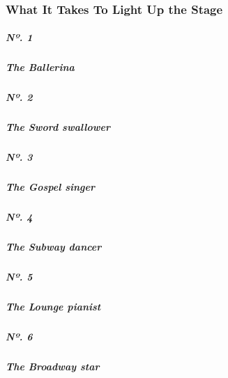 \hypertarget{what-it-takes-to-light-up-the-stage-1}{%
\subsubsection{What It Takes To Light Up the
Stage}\label{what-it-takes-to-light-up-the-stage-1}}

\href{https://www.nytimes3xbfgragh.onion/interactive/2019/05/30/magazine/dance-ballet-new-york.html}{}

\hypertarget{nuxba-1}{%
\subparagraph{Nº. 1}\label{nuxba-1}}

\hypertarget{the-ballerina}{%
\subparagraph{The Ballerina}\label{the-ballerina}}

\href{https://www.nytimes3xbfgragh.onion/interactive/2019/05/30/magazine/sword-swallowing-new-york.html}{}

\hypertarget{nuxba-2}{%
\subparagraph{Nº. 2}\label{nuxba-2}}

\hypertarget{the-sword-swallower}{%
\subparagraph{The Sword swallower}\label{the-sword-swallower}}

\href{https://www.nytimes3xbfgragh.onion/interactive/2019/05/30/magazine/gospel-singer-new-york.html}{}

\hypertarget{nuxba-3}{%
\subparagraph{Nº. 3}\label{nuxba-3}}

\hypertarget{the-gospel-singer}{%
\subparagraph{The Gospel singer}\label{the-gospel-singer}}

\href{https://www.nytimes3xbfgragh.onion/interactive/2019/05/30/magazine/subway-dance-new-york.html}{}

\hypertarget{nuxba-4}{%
\subparagraph{Nº. 4}\label{nuxba-4}}

\hypertarget{the-subway-dancer}{%
\subparagraph{The Subway dancer}\label{the-subway-dancer}}

\href{https://www.nytimes3xbfgragh.onion/interactive/2019/05/30/magazine/earl-rose-piano-carlyle-new-york.html}{}

\hypertarget{nuxba-5}{%
\subparagraph{Nº. 5}\label{nuxba-5}}

\hypertarget{the-lounge-pianist}{%
\subparagraph{The Lounge pianist}\label{the-lounge-pianist}}

\href{https://www.nytimes3xbfgragh.onion/interactive/2019/05/30/magazine/broadway-kiss-me-kate.html}{}

\hypertarget{nuxba-6}{%
\subparagraph{Nº. 6}\label{nuxba-6}}

\hypertarget{the-broadway-star}{%
\subparagraph{The Broadway star}\label{the-broadway-star}}

